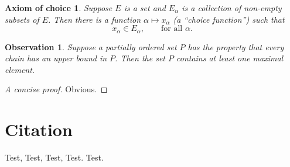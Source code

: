 \newtheorem*{axiomofchoice}{Axiom of choice}
\begin{axiomofchoice}
    Suppose $E$ is a set and ${E_\alpha}$ is a collection of
    non-empty subsets of $E$. Then there is a function $\alpha
    \mapsto x_\alpha$ (a ``choice function'') such that
    \begin{equation}
        x_\alpha \in E_\alpha,\qquad \text{for all }\alpha.
    \end{equation}
\end{axiomofchoice}

\newtheorem{observation}{Observation}
\begin{observation}
    Suppose a partially ordered set $P$ has the property
    that every chain has an upper bound in $P$. Then the
    set $P$ contains at least one maximal element.
\end{observation}
\begin{proof}[A concise proof]
    Obvious.
\end{proof}

\chapter{Citation}

Test\cite{mittelbach04},
Test\cite{lamport94},
Test\cite{knuth86a,lamport94,mittelbach04},
Test\cite{刘海洋2013}.
Test\cite{knuth84}.
